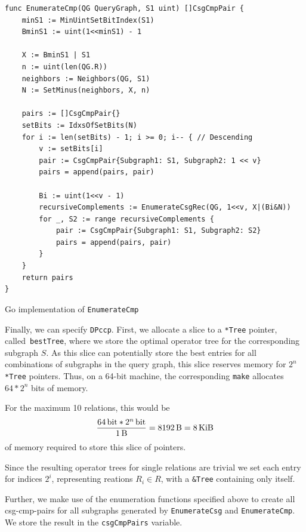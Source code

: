 \begin{algorithm}[H]
\begin{verbatim}
func EnumerateCmp(QG QueryGraph, S1 uint) []CsgCmpPair {
    minS1 := MinUintSetBitIndex(S1)
    BminS1 := uint(1<<minS1) - 1

    X := BminS1 | S1
    n := uint(len(QG.R))
    neighbors := Neighbors(QG, S1)
    N := SetMinus(neighbors, X, n)

    pairs := []CsgCmpPair{}
    setBits := IdxsOfSetBits(N)
    for i := len(setBits) - 1; i >= 0; i-- { // Descending
        v := setBits[i]
        pair := CsgCmpPair{Subgraph1: S1, Subgraph2: 1 << v}
        pairs = append(pairs, pair)

        Bi := uint(1<<v - 1)
        recursiveComplements := EnumerateCsgRec(QG, 1<<v, X|(Bi&N))
        for _, S2 := range recursiveComplements {
            pair := CsgCmpPair{Subgraph1: S1, Subgraph2: S2}
            pairs = append(pairs, pair)
        }
    }
    return pairs
}
\end{verbatim}
\caption{Go implementation of \texttt{EnumerateCmp}}
\label{alg:enumeratecmp}
\end{algorithm}
\newpage

Finally, we can specify \texttt{DPccp}. 
First, we allocate a slice to a \texttt{*Tree} pointer, called \texttt{bestTree}, where we store the optimal operator tree for the corresponding subgraph $S$. As this slice can potentially store the best entries for all combinations of subgraphs in the query graph, this slice reserves memory for $2^n$ \texttt{*Tree} pointers. Thus, on a 64-bit machine, the corresponding \texttt{make} allocates $64 * 2^n$ bits of memory.

\begin{example}
For the maximum 10 relations, this would be 
\begin{equation}
\frac{\SI{64}{\bit} * \SI[parse-numbers = false]{2^n}{\bit}}{\SI{1}{\byte}} = \SI{8192}{\byte} = \SI{8}{\kibi\byte}
\end{equation}
of memory required to store this slice of pointers.
\end{example}

Since the resulting operator trees for single relations are trivial we set each entry for indices $2^i$, representing reations $R_i \in R$, with a \texttt{\&Tree} containing only itself. 

Further, we make use of the enumeration functions specified above to create all csg-cmp-pairs for all subgraphs generated by \texttt{EnumerateCsg} and \texttt{EnumerateCmp}. We store the result in the \texttt{csgCmpPairs} variable.

